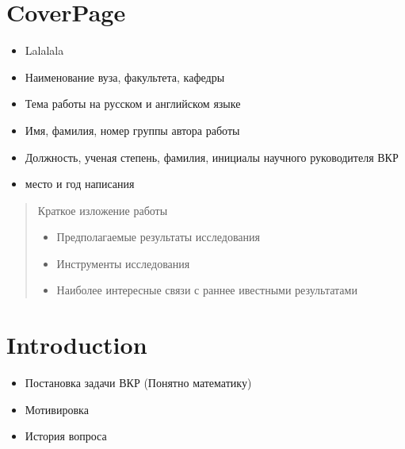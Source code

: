 \documentclass[11pt]{article}
\begin{document}
    \section*{CoverPage}
        \begin{itemize}
            \item Lalalala
            \item Наименование вуза, факультета, кафедры
            \item Тема работы на русском и английском языке
            \item Имя, фамилия, номер группы автора работы
            \item Должность, ученая степень, фамилия,
            инициалы научного руководителя ВКР
            \item место и год написания
        \end{itemize}

    \begin{abstract}
        Краткое изложение работы
        \begin{itemize}
            \item Предполагаемые результаты исследования
            \item Инструменты исследования
            \item Наиболее интересные связи с раннее ивестными результатами
        \end{itemize}


    \end{abstract}


    \section{Introduction}\label{sec:introduction}
        \begin{itemize}
            \item Постановка задачи ВКР (Понятно математику)
            \item Мотивировка
            \item История вопроса
        \end{itemize}
\end{document}
